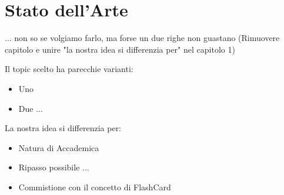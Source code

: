 

\chapter{Stato dell'Arte}
 ... non so se volgiamo farlo, ma forse un due righe non guastano
 (Rimuovere capitolo e unire "la nostra idea si differenzia per" nel capitolo 1)
 
Il topic scelto ha parecchie varianti:

\begin{itemize}
    \item Uno
    \item Due ...
\end{itemize}
 
La nostra idea si differenzia per: 

\begin{itemize}
    \item Natura di Accademica
    \item Ripasso possibile ...
    \item Commistione con il concetto di FlashCard
\end{itemize}